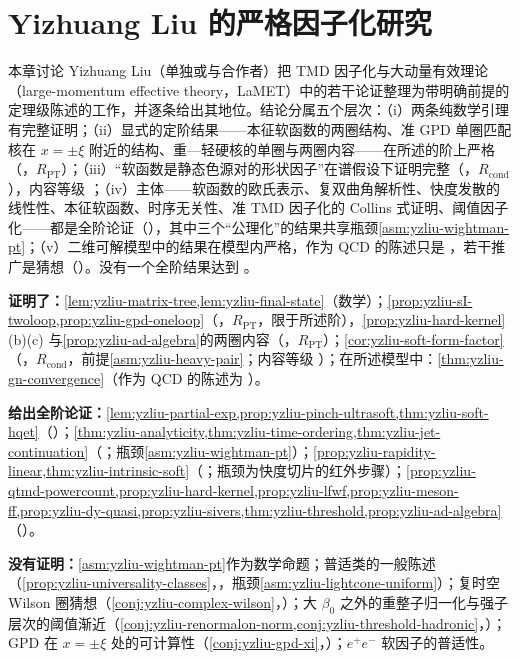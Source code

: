 \chapter{Yizhuang Liu 的严格因子化研究}\label{ch:yzliu}

本章讨论 Yizhuang Liu（单独或与合作者）把 TMD 因子化与大动量有效理论（large-momentum effective theory，LaMET）中的若干论证整理为带明确前提的定理级陈述的工作，并逐条给出其地位。结论分属五个层次：（i）两条纯数学引理有完整证明；（ii）显式的定阶结果——本征软函数的两圈结构、准 GPD 单圈匹配核在 $x=\pm\xi$ 附近的结构、重—轻硬核的单圈与两圈内容——在所述的阶上严格（\tagR，$R_{\mathrm{PT}}$）；（iii）“软函数是静态色源对的形状因子”在谱假设下证明完整（\tagR，$R_{\mathrm{cond}}$），内容等级 \tagC；（iv）主体——软函数的欧氏表示、复双曲角解析性、快度发散的线性性、本征软函数、时序无关性、准 TMD 因子化的 Collins 式证明、阈值因子化——都是全阶论证（\tagA），其中三个“公理化”的结果共享瓶颈\cref{asm:yzliu-wightman-pt}；（v）二维可解模型中的结果在模型内严格，作为 QCD 的陈述只是 \tagP，若干推广是猜想（\tagC）。没有一个全阶结果达到 \tagR。

\begin{tcolorbox}[enhanced,breakable,title=本章证明了什么／没有证明什么,fonttitle=\bfseries,
  colback=gray!3!white,colframe=gray!55!black,boxrule=0.6pt,arc=2pt,
  left=5pt,right=5pt,top=3pt,bottom=3pt,before skip=6pt,after skip=6pt]
\textbf{证明了：}\cref{lem:yzliu-matrix-tree,lem:yzliu-final-state}（数学）；\cref{prop:yzliu-sI-twoloop,prop:yzliu-gpd-oneloop}（\tagR，$R_{\mathrm{PT}}$，限于所述阶），\cref{prop:yzliu-hard-kernel}(b)(c) 与\cref{prop:yzliu-ad-algebra}的两圈内容（\tagR，$R_{\mathrm{PT}}$）；\cref{cor:yzliu-soft-form-factor}（\tagR，$R_{\mathrm{cond}}$，前提\cref{asm:yzliu-heavy-pair}；内容等级 \tagC）；在所述模型中：\cref{thm:yzliu-gn-convergence}（作为 QCD 的陈述为 \tagP）。\par
\textbf{给出全阶论证：}\cref{lem:yzliu-partial-exp,prop:yzliu-pinch-ultrasoft,thm:yzliu-soft-hqet}（\tagA）；\cref{thm:yzliu-analyticity,thm:yzliu-time-ordering,thm:yzliu-jet-continuation}（\tagA；瓶颈\cref{asm:yzliu-wightman-pt}）；\cref{prop:yzliu-rapidity-linear,thm:yzliu-intrinsic-soft}（\tagA；瓶颈为快度切片的红外步骤）；\cref{prop:yzliu-qtmd-powercount,prop:yzliu-hard-kernel,prop:yzliu-lfwf,prop:yzliu-meson-ff,prop:yzliu-dy-quasi,prop:yzliu-sivers,thm:yzliu-threshold,prop:yzliu-ad-algebra}（\tagA）。\par
\textbf{没有证明：}\cref{asm:yzliu-wightman-pt}作为数学命题；普适类的一般陈述（\cref{prop:yzliu-universality-classes}，\tagP，瓶颈\cref{asm:yzliu-lightcone-uniform}）；复时空 Wilson 圈猜想（\cref{conj:yzliu-complex-wilson}，\tagC）；大 $\beta_0$ 之外的重整子归一化与强子层次的阈值渐近（\cref{conj:yzliu-renormalon-norm,conj:yzliu-threshold-hadronic}，\tagC）；GPD 在 $x=\pm\xi$ 处的可计算性（\cref{conj:yzliu-gpd-xi}，\tagC）；$e^+e^-$ 软因子的普适性。
\end{tcolorbox}

